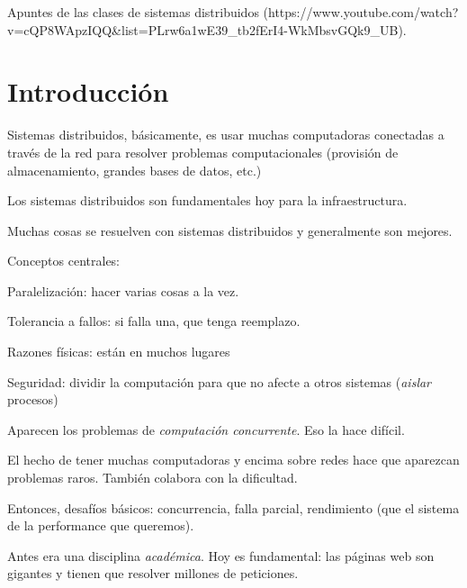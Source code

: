 Apuntes de las clases de sistemas distribuidos
(https://www.youtube.com/watch?v=cQP8WApzIQQ&list=PLrw6a1wE39_tb2fErI4-WkMbsvGQk9_UB).

\section{Introducción}

Sistemas distribuidos,
básicamente,
es usar muchas computadoras conectadas a través de la red para resolver
problemas computacionales
(provisión de almacenamiento, grandes bases de datos, etc.)

Los sistemas distribuidos son fundamentales hoy para la infraestructura.

Muchas cosas se resuelven con sistemas distribuidos y generalmente son mejores.

Conceptos centrales:

Paralelización: hacer varias cosas a la vez.

Tolerancia a fallos: si falla una, que tenga reemplazo.

Razones físicas: están en muchos lugares

Seguridad: dividir la computación para que no afecte a otros sistemas
(\textit{aislar} procesos)

Aparecen los problemas de \textit{computación concurrente}.
Eso la hace difícil.

El hecho de tener muchas computadoras y encima sobre redes 
hace que aparezcan problemas raros.
También colabora con la dificultad.

Entonces, desafíos básicos: concurrencia, falla parcial,
rendimiento (que el sistema de la performance que queremos).

Antes era una disciplina \textit{académica}.
Hoy es fundamental: las páginas web son gigantes y tienen que resolver 
millones de peticiones.


